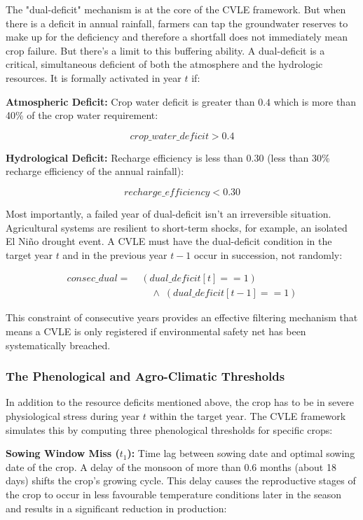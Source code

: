 \documentclass{ieeeaccess}
\begin{document}
The "dual-deficit" mechanism is at the core of the CVLE framework. But when there is a deficit in annual rainfall, farmers can tap the groundwater reserves to make up for the deficiency and therefore a shortfall does not immediately mean crop failure. But there's a limit to this buffering ability. A dual-deficit is a critical, simultaneous deficient of both the atmosphere and the hydrologic resources. It is formally activated in year $t$ if:

\textbf{Atmospheric Deficit:} Crop water deficit is greater than $0.4$ which is more than 40\% of the crop water requirement:

\[
crop\_water\_deficit > 0.4
\]

\textbf{Hydrological Deficit:} Recharge efficiency is less than $0.30$ (less than 30\% recharge efficiency of the annual rainfall):

\[
recharge\_efficiency < 0.30
\]

Most importantly, a failed year of dual-deficit isn't an irreversible situation. Agricultural systems are resilient to short-term shocks, for example, an isolated El Niño drought event. A CVLE must have the dual-deficit condition in the target year $t$ and in the previous year $t-1$ occur in succession, not randomly:

\[
\begin{aligned}
\mathit{consec\_dual} = \;
&(\mathit{dual\_deficit}[t] == 1) \\
&\quad \land\; (\mathit{dual\_deficit}[t{-}1] == 1)
\end{aligned}
\]

This constraint of consecutive years provides an effective filtering mechanism that means a CVLE is only registered if environmental safety net has been systematically breached.

\subsubsection{The Phenological and Agro-Climatic Thresholds}

In addition to the resource deficits mentioned above, the crop has to be in severe physiological stress during year $t$ within the target year. The CVLE framework simulates this by computing three phenological thresholds for specific crops:

\textbf{Sowing Window Miss ($t_1$):} Time lag between sowing date and optimal sowing date of the crop. A delay of the monsoon of more than $0.6$ months (about 18 days) shifts the crop's growing cycle. This delay causes the reproductive stages of the crop to occur in less favourable temperature conditions later in the season and results in a significant reduction in production:
\end{document}

